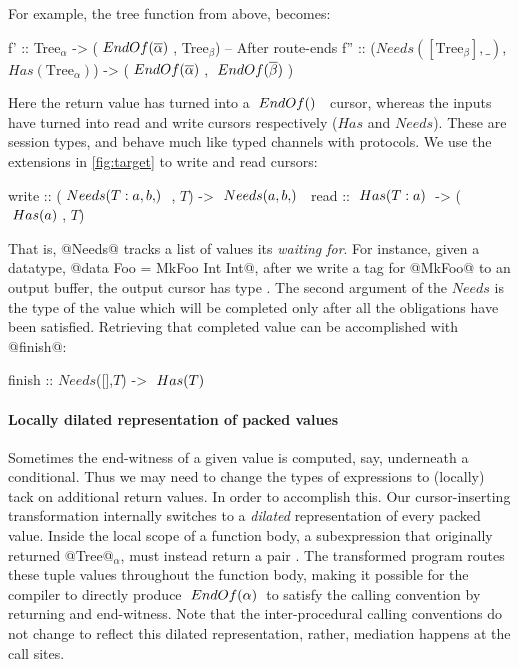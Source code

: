 \documentclass[a4paper,english]{lipics-v2016}
\newcommand{\fresh}[1]{\ensuremath{#1}}
\newcommand{\freshA}{\fresh{\alpha}}
\newcommand{\freshB}{\fresh{\beta}}
\newcommand{\locend}[1]{\ensuremath{\overline{#1}}}
\begin{document}
\noindent
For example, the tree function from above, becomes:
\begin{code}
  f'  :: Tree$_\freshA$ -> ($\ENDOF{\locend{\freshA}}$, Tree$_\freshB$) -- After route-ends
  f'' :: ($Needs([\text{Tree}_\freshB],\_)$, $Has(\text{Tree}_\freshA)$) -> ($\ENDOF{\locend{\freshA}}$, $\ENDOF{\locend{\freshB}}$)
\end{code}
%

Here the return value has turned into a $\ENDOF$ cursor, whereas the inputs have
turned into read and write cursors respectively ($Has$ and $Needs$).  These are session types, and
behave much like typed channels with protocols.  We use the extensions in
\cref{fig:target} to write and read cursors:

\begin{code}
  write :: ($\NEEDS{T:a, b}$, $T$) ->  $\NEEDS{a,b}$
  read  :: $\; Has(T:a) \;$ ->   ($\; Has(a) \;$, $T$)
\end{code}

That is, @Needs@ tracks a list of values its {\em waiting for}.  For instance,
given a datatype, @data Foo = MkFoo Int Int@, after we write a tag for @MkFoo@
to an output buffer, the output cursor has type .
The second argument of the $Needs$ is the type of the value which will be
completed only after all the obligations have been satisfied.  Retrieving that
completed value can be accomplished with @finish@:

\begin{code}
  finish :: $Needs$([],$T$) -> $\; Has(T) \;$
\end{code}


\paragraph*{Locally dilated representation of packed values}

Sometimes the end-witness of a given value is computed, say, underneath a
conditional.  Thus we may need to change the types of expressions to (locally)
tack on additional return values.
%
In order to accomplish this.  Our cursor-inserting transformation internally
switches to a {\em dilated} representation of every packed value.  Inside the
local scope of a function body, a subexpression that originally returned @Tree@$_\freshA$,
must instead return a pair \il{($Has$(Tree$_\freshA$), $\ENDOF{\freshA}$)}.
%
The transformed program routes these tuple values throughout the function body,
making it possible for the compiler to directly produce $\ENDOF{\freshA}$ to
satisfy the calling convention by returning and end-witness.
%
Note that the inter-procedural calling conventions do not change to reflect this
dilated representation, rather, mediation happens at the call sites.
\end{document}
